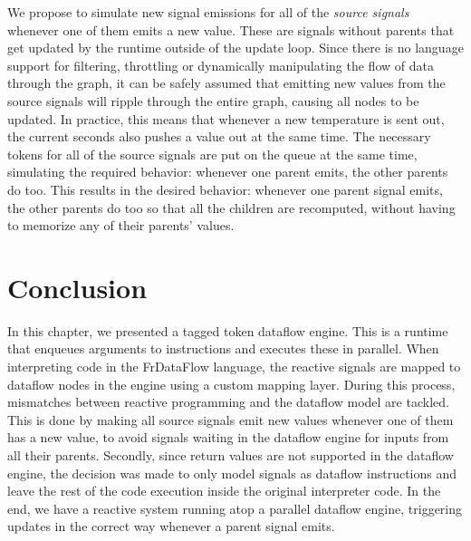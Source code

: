 We propose to simulate new signal emissions for all of the \textit{source signals} whenever one of them emits a new value. These are signals without parents that get updated by the runtime outside of the update loop. Since there is no language support for filtering, throttling or dynamically manipulating the flow of data through the graph, it can be safely assumed that emitting new values from the source signals will ripple through the entire graph, causing all nodes to be updated. In practice, this means that whenever a new temperature is sent out, the current seconds also pushes a value out at the same time. The necessary tokens for all of the source signals are put on the queue at the same time, simulating the required behavior: whenever one parent emits, the other parents do too. This results in the desired behavior: whenever one parent signal emits, the other parents do too so that all the children are recomputed, without having to memorize any of their parents' values. 

\newpage
\section{Conclusion}

In this chapter, we presented a tagged token dataflow engine. This is a runtime that enqueues arguments to instructions and executes these in parallel. 
When interpreting code in the FrDataFlow language, the reactive signals are mapped to dataflow nodes in the engine using a custom mapping layer. During this process, mismatches between reactive programming and the dataflow model are tackled. This is done by making all source signals emit new values whenever one of them has a new value, to avoid signals waiting in the dataflow engine for inputs from all their parents. Secondly, since return values are not supported in the dataflow engine, the decision was made to only model signals as dataflow instructions and leave the rest of the code execution inside the original interpreter code. 
In the end, we have a reactive system running atop a parallel dataflow engine, triggering updates in the correct way whenever a parent signal emits. 





